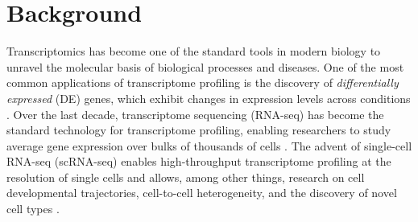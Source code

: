 \documentclass{bmcart}
\begin{document}




\section*{Background}
Transcriptomics has become one of the standard tools in modern biology to unravel the molecular basis of biological processes and diseases. One of the most common applications of transcriptome profiling is the discovery of \textit{differentially expressed} (DE) genes, which exhibit changes in expression levels across conditions \citep{Love2014, Robinson2010a, Law2014}. Over the last decade, transcriptome sequencing (RNA-seq) has become the standard technology for transcriptome profiling, enabling researchers to study average gene expression over bulks of thousands of cells \citep{Wang2009, Goodwin2016}.  
The advent of single-cell RNA-seq (scRNA-seq) enables high-throughput transcriptome profiling at the resolution of single cells and allows, among other things, research on cell developmental trajectories, cell-to-cell heterogeneity, and the discovery of novel cell types \citep{Lonnberg2017, Buettner2015, Patel2014, Kolodziejczyk2015, Li2017, Usoskin2014}.
\end{document}

